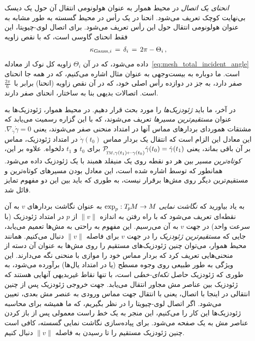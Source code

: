 \emph{انحنای یک اتصال} در محیط هموار به عنوان هولونومی انتقال آن حول یک دیسک بی‌نهایت کوچک تعریف می‌شود.
انحنا در یک رأس در محیط گسسته به طور مشابه به عنوان هولونومی انتقال حول این رأس تعریف می‌شود.
برای اتصال لوی-چیویتا، این فقط انحنای گاوسی است، که با نقص زاویه
\begin{align}
    \kappa_{\textup{Gauss},i} \,=\, \delta_i \,=\, 2\pi - \Theta_i \,,
\end{align}
داده می‌شود، که در آن $\Theta_i$ زاویه کل نوک از معادله~\eqref{eq:mesh_total_incident_angle} است.
ما دوباره به بیست‌وجهی به عنوان مثال اشاره می‌کنیم، که در همه جا انحنای صفر دارد، به جز در دوازده رأس اصلی خود، که در آن نقص زاویه (انحنا) برابر با~$\frac{2\pi}{6}$ است.
اتصالات بدیهی بنا به ساختار، انحنای صفر دارند.


در آخر، ما باید \emph{ژئودزیک‌ها} را مورد بحث قرار دهیم.
در محیط هموار، ژئودزیک‌ها به عنوان \emph{مستقیم‌ترین مسیرها} تعریف می‌شوند، که با این گزاره رسمیت می‌یابد که مشتقات هموردای بردارهای مماس آنها در امتداد منحنی صفر می‌شوند، یعنی $\nabla_{\dot{\gamma}} \dot{\gamma} = 0$.
این معادل این الزام است که انتقال یک بردار مماس $\dot{\gamma}(t_0)$ در امتداد ژئودزیک، مماس بر آن باقی بماند، یعنی
$\mathcal{P}_{\mkern-2mu\overset{}{\protect\scalebox{.6}{$\!T\!M$}, \gamma(t_1) \leftarrow \gamma(t_0)}}
 \dot{\gamma}(t_0) = \dot{\gamma}(t_1)$
برای $t_0$ و $t_1$ دلخواه.
علاوه بر این، \emph{کوتاه‌ترین مسیر} بین هر دو نقطه روی یک منیفلد همبند با یک ژئودزیک داده می‌شود.
همانطور که توسط \citet{polthier1998straightest} اشاره شده است، این معادل بودن مسیرهای کوتاه‌ترین و مستقیم‌ترین دیگر روی مش‌ها برقرار نیست، به طوری که باید بین این دو مفهوم تمایز قائل شد.


به یاد بیاورید که \emph{نگاشت نمایی} $\exp_p: T_{\mkern-1.5mu p}\mkern-.5muM \to M$ به عنوان نگاشت بردارهای $v$ به آن نقطه‌ای تعریف می‌شود که با راه رفتن به اندازه $\lVert v\rVert$ از $p$ در امتداد ژئودزیک (با سرعت واحد) در جهت $v$ به آن می‌رسیم.
این مفهوم به راحتی به مش‌ها تعمیم می‌یابد، جایی که \emph{مستقیم‌ترین ژئودزیک} را در جهت $v$ برای فاصله $\lVert v\rVert$ دنبال می‌کنیم.
همانند محیط هموار، می‌توان چنین ژئودزیک‌های مستقیم را روی مش‌ها به عنوان آن دسته از منحنی‌هایی تعریف کرد که بردار مماس خود را موازی با منحنی نگه می‌دارند.
این ویژگی به طور طبیعی روی وجوه مسطح (یا در امتداد یال‌ها) برآورده می‌شود، به طوری که ژئودزیک حاصل \emph{تکه‌ای-خطی} است، با تنها نقاط غیربدیهی آنهایی هستند که ژئودزیک بین عناصر مش مجاور انتقال می‌یابد.
جهت خروجی ژئودزیک پس از چنین انتقالی در اینجا با اتصال، یعنی با انتقال جهت مماس ورودی به عنصر مش بعدی، تعیین می‌شود.
اگر اتصال لوی-چیویتا را در نظر بگیریم، که ما همیشه برای محاسبه ژئودزیک‌ها این کار را می‌کنیم، این منجر به یک خط راست معمولی پس از باز کردن عناصر مش به یک صفحه می‌شود.
برای پیاده‌سازی نگاشت نمایی گسسته، کافی است چنین ژئودزیک مستقیم را تا رسیدن به فاصله $\lVert v\rVert$ دنبال کنیم.


